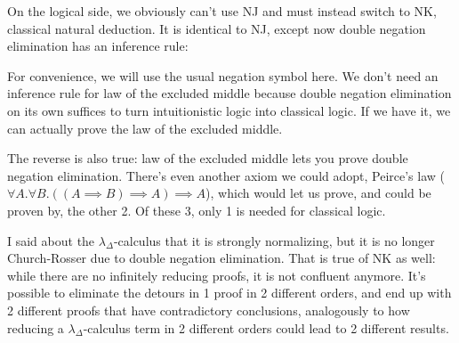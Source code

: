 \documentclass[12pt]{article}
\begin{document}
On the logical side, we obviously can't use NJ and must instead switch to NK, classical natural deduction. It is identical to NJ, except now double negation elimination has an inference rule:

\begin{prooftree}
\end{prooftree}

For convenience, we will use the usual negation symbol here. We don't need an inference rule for law of the excluded middle because double negation elimination on its own suffices to turn intuitionistic logic into classical logic. If we have it, we can actually prove the law of the excluded middle.

The reverse is also true: law of the excluded middle lets you prove double negation elimination. There's even another axiom we could adopt, Peirce's law ($\forall A. \forall B. ((A \implies B) \implies A) \implies A$), which would let us prove, and could be proven by, the other 2. Of these 3, only 1 is needed for classical logic.

    
    


    

I said about the $\lambda_\Delta$-calculus that it is strongly normalizing, but it is no longer Church-Rosser due to double negation elimination. That is true of NK as well: while there are no infinitely reducing proofs, it is not confluent anymore. It's possible to eliminate the detours in 1 proof in 2 different orders, and end up with 2 different proofs that have contradictory conclusions, analogously to how reducing a $\lambda_\Delta$-calculus term in 2 different orders could lead to 2 different results.
\end{document}
